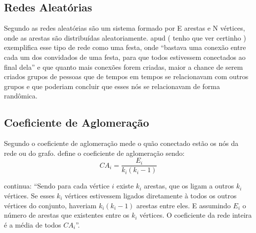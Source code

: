      
\subsection{Redes Aleatórias}
Segundo \citet{Viana2007} as redes aleatórias são um sistema formado por E arestas e N vértices, onde as arestas são distribuídas aleatoriamente. \citet{CunhaRecuero2004} apud ( tenho que ver certinho ) exemplifica esse tipo de rede como uma festa, onde “bastava uma conexão entre cada um dos convidados de uma festa, para que todos estivessem conectados ao final dela” e que quanto mais conexões forem criadas, maior a chance de serem criados grupos de pessoas que de tempos em tempos se relacionavam com outros grupos e que poderiam concluir que esses nós se relacionavam de forma randômica.

 
 \subsection{Coeficiente de Aglomeração}
 Segundo \citet{Viana2007} o coeficiente de aglomeração mede o quão conectado estão os nós da rede ou do grafo. \citet{Antiqueira2005}  define o coeficiente de aglomeração sendo:\[CA_i = \frac{E_i}{k_i(k_i-1)}\]


\citet{Antiqueira2005}  continua: “Sendo para cada vértice \(i\) existe \(k_i\) arestas, que os ligam a outros \(k_i\) vértices. Se esses \(k_i\) vértices estivessem ligados diretamente à todos os outros vértices do conjunto, haveriam \(k_i(k_i- 1)\) arestas entre eles. E assumindo \(E_i\) o número de arestas que existentes entre os \(k_i\) vértices.	O coeficiente da rede inteira é a média de todos \(CA_i\)”.


